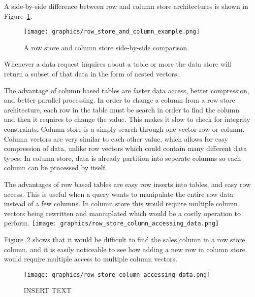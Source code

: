 \documentclass[letterpaper, 12pt]{article}
\begin{document}
A side-by-side difference between row and column store architectures is shown in Figure~\ref{fig:row_column_diff}.

\par\vspace{\baselineskip}
\begin{figure}
  \centering
  \texttt{[image: graphics/row\_store\_and\_column\_example.png]}
   \cite{rowstorefigure}
  \label{fig:row_column_diff}
  \caption{A row store and column store side-by-side comparison.}
\end{figure}

Whenever a data request inquires about a table or more the data store will return a subset of that
data in the form of nested vectors.
\par\vspace{\baselineskip}

The advantage of column based tables are faster data access, better compression, and better parallel processing.
In order to change a column from a row store architecture, each row in the table must be search in order to find the
column and then it requires to change the value. This makes it slow to check for integrity constraints. Column store
is a simply search through one vector row or column. Column vectors are very similar to each other value, which allows
for easy compression of data, unlike row vectors which could contain many different data types. In column store, data
is already partition into seperate columns so each column can be processed by itself.
\par\vspace{\baselineskip}

The advantages of row based tables are easy row inserts into tables, and easy row access. This is useful when a query
wants to manipulate the entire row data instead of a few columns. In column store this would require multiple column vectors
being rewritten and maniuplated which would be a costly operation to perform.
\texttt{[image: graphics/row\_store\_column\_accessing\_data.png]}
\cite{rowstorefigure}

Figure~\ref{fig:row_col_access_data} shows that it would be 
difficult to find the sales column in a row store column, and it is easily
noticeable to see how adding a new row in column store would require multiple
access to multiple column vectors.
\par\vspace{\baselineskip}

\begin{figure}
  \centering
  \texttt{[image: graphics/row\_store\_column\_accessing\_data.png]}
  \caption{INSERT TEXT}
  \label{fig:row_col_access_data}
\end{figure}
\end{document}
